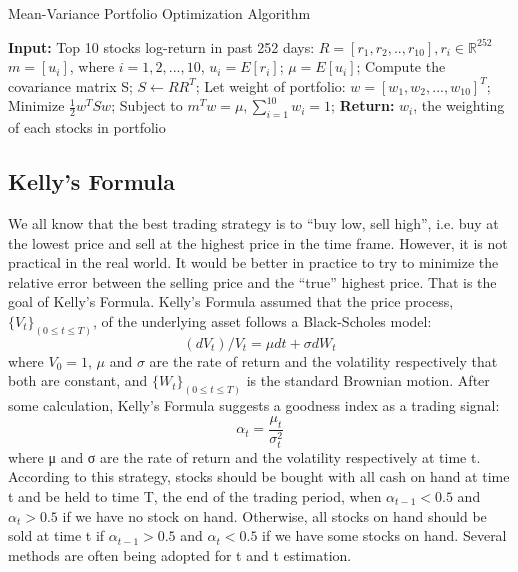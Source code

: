 \documentclass[11pts]{article}
\begin{document}
\begin{algorithm}[H]
\caption{Mean-Variance Portfolio Optimization Algorithm}
\begin{algorithmic}[1]
\State \textbf{Input:} Top 10 stocks log-return in past 252 days: $R = [r_{1}, r_{2}, .., r_{10}], r_{i} \in \mathbb{R}^{252}$
\State $m = [u_{i}]$, where $i = 1,2, ..., 10$, $u_{i}=E[r_{i}]$;
\State $\mu = E[u_{i}]$;
\State Compute the covariance matrix S;
\State $S \gets RR^{T}$;
\State Let weight of portfolio: $w = [w_{1},w_{2}, ...,w_{10}]^{T}$;
\State Minimize $\frac{1}{2}w^{T}Sw$; Subject to $m^{T}w = \mu, \sum_{i=1}^{10}w_{i} = 1$;
\State \textbf{Return:} $w_{i}$, the weighting of each stocks in portfolio
\end{algorithmic}
\end{algorithm}
\subsection{Kelly's Formula}
\label{sec:org864cc70}
We all know that the best trading strategy is to ``buy low, sell high'', i.e. buy at the lowest price and sell at the highest price in the time frame. However, it is not practical in the real world. It would be better in practice to try to minimize the relative error between the selling price and the ``true'' highest price. That is the goal of Kelly's Formula.
Kelly's Formula assumed that the price process, \(\{V_{t}\}_{(0\leq t\leq T)}\), of the underlying asset follows a Black-Scholes model: 
\begin{equation}
(dV_{t})/V_{t} = \mu dt + \sigma dW_{t}
\end{equation}
where \(V_{0} = 1\), \(\mu\) and \(\sigma\) are the rate of return and the volatility respectively that both are constant, and \(\{W_{t}\}_{(0\leq t \leq T)}\) is the standard Brownian motion.
After some calculation, Kelly’s Formula suggests a goodness index as a trading signal:
\begin{equation}
\alpha_{t} = \frac{\mu_{t}}{\sigma_{t}^{2}}
\end{equation}
where μ and σ are the rate of return and the volatility respectively at time t.
According to this strategy, stocks should be bought with all cash on hand at time t and be held to time T, the end of the trading period, when \(\alpha_{t-1}<0.5\) and \(\alpha_{t}>0.5\) if we have no stock on hand.
Otherwise, all stocks on hand should be sold at time t if \(\alpha_{t-1}>0.5\) and \(\alpha_{t}<0.5\) if we have some stocks on hand.
Several methods are often being adopted for t and t estimation. 
\end{document}
